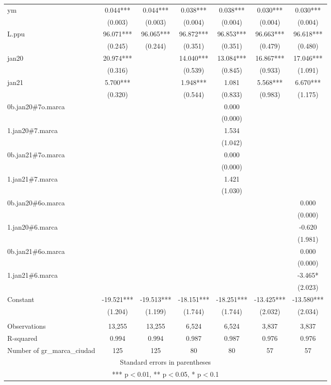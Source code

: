 \begin{tabular}{lcccccc}
ym & 0.044*** & 0.044*** & 0.038*** & 0.038*** & 0.030*** & 0.030*** \\
 & (0.003) & (0.003) & (0.004) & (0.004) & (0.004) & (0.004) \\
L.ppu & 96.071*** & 96.065*** & 96.872*** & 96.853*** & 96.663*** & 96.618*** \\
 & (0.245) & (0.244) & (0.351) & (0.351) & (0.479) & (0.480) \\
jan20 & 20.974*** &  & 14.040*** & 13.084*** & 16.867*** & 17.046*** \\
 & (0.316) &  & (0.539) & (0.845) & (0.933) & (1.091) \\
jan21 & 5.700*** &  & 1.948*** & 1.081 & 5.568*** & 6.670*** \\
 & (0.320) &  & (0.544) & (0.833) & (0.983) & (1.175) \\
0b.jan20\#7o.marca &  &  &  & 0.000 &  &  \\
 &  &  &  & (0.000) &  &  \\
1.jan20\#7.marca &  &  &  & 1.534 &  &  \\
 &  &  &  & (1.042) &  &  \\
0b.jan21\#7o.marca &  &  &  & 0.000 &  &  \\
 &  &  &  & (0.000) &  &  \\
1.jan21\#7.marca &  &  &  & 1.421 &  &  \\
 &  &  &  & (1.030) &  &  \\
0b.jan20\#6o.marca &  &  &  &  &  & 0.000 \\
 &  &  &  &  &  & (0.000) \\
1.jan20\#6.marca &  &  &  &  &  & -0.620 \\
 &  &  &  &  &  & (1.981) \\
0b.jan21\#6o.marca &  &  &  &  &  & 0.000 \\
 &  &  &  &  &  & (0.000) \\
1.jan21\#6.marca &  &  &  &  &  & -3.465* \\
 &  &  &  &  &  & (2.023) \\
Constant & -19.521*** & -19.513*** & -18.151*** & -18.251*** & -13.425*** & -13.580*** \\
 & (1.204) & (1.199) & (1.744) & (1.744) & (2.032) & (2.034) \\
 &  &  &  &  &  &  \\
Observations & 13,255 & 13,255 & 6,524 & 6,524 & 3,837 & 3,837 \\
R-squared & 0.994 & 0.994 & 0.987 & 0.987 & 0.976 & 0.976 \\
 Number of gr\_marca\_ciudad & 125 & 125 & 80 & 80 & 57 & 57 \\ \hline
\multicolumn{7}{c}{ Standard errors in parentheses} \\
\multicolumn{7}{c}{ *** p$<$0.01, ** p$<$0.05, * p$<$0.1} \\
\end{tabular}
